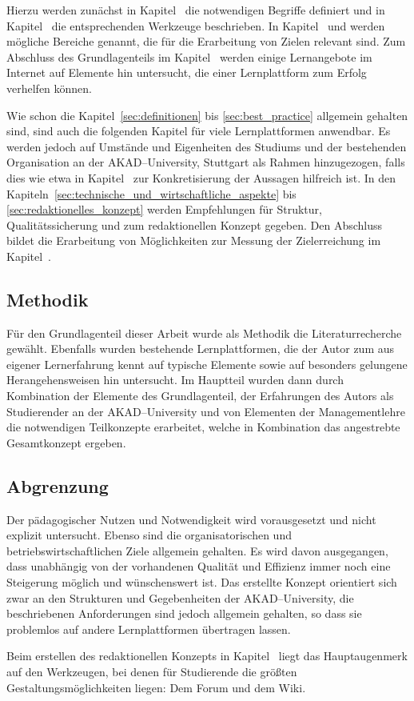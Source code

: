 Hierzu werden zunächst in Kapitel~ die notwendigen Begriffe definiert und in Kapitel~ die entsprechenden Werkzeuge beschrieben. In Kapitel~ und  werden mögliche Bereiche genannt, die für die Erarbeitung von Zielen relevant sind. Zum Abschluss des Grundlagenteils im Kapitel~ werden einige Lernangebote im Internet auf Elemente hin untersucht, die einer Lernplattform zum Erfolg verhelfen können.

Wie schon die Kapitel~\ref{sec:definitionen} bis \ref{sec:best_practice} allgemein gehalten sind, sind auch die folgenden Kapitel für viele Lernplattformen anwendbar. Es werden jedoch auf Umstände und Eigenheiten des Studiums und der bestehenden Organisation an der AKAD–University, Stuttgart als Rahmen hinzugezogen, falls dies wie etwa in Kapitel~ zur Konkretisierung der Aussagen hilfreich ist. In den Kapiteln~\ref{sec:technische_und_wirtschaftliche_aspekte} bis \ref{sec:redaktionelles_konzept} werden Empfehlungen für Struktur, Qualitätssicherung und zum redaktionellen Konzept gegeben. Den Abschluss bildet die Erarbeitung von Möglichkeiten zur Messung der Zielerreichung im Kapitel~.

\subsection{Methodik} %
\label{sub:methodik}
Für den Grundlagenteil dieser Arbeit wurde als Methodik die Literaturrecherche gewählt. Ebenfalls wurden bestehende Lernplattformen, die der Autor zum aus eigener Lernerfahrung kennt auf typische Elemente sowie auf besonders gelungene Herangehensweisen hin untersucht. Im Hauptteil wurden dann durch Kombination der Elemente des Grundlagenteil, der Erfahrungen des Autors als Studierender an der AKAD–University und von Elementen der Managementlehre die notwendigen Teilkonzepte erarbeitet, welche in Kombination das angestrebte Gesamtkonzept ergeben.

\subsection{Abgrenzung} %
\label{sub:abgrenzung}
Der pädagogischer Nutzen und Notwendigkeit wird vorausgesetzt und nicht explizit untersucht. Ebenso sind die organisatorischen und betriebswirtschaftlichen Ziele allgemein gehalten. Es wird davon ausgegangen, dass unabhängig von der vorhandenen Qualität und Effizienz immer noch eine Steigerung möglich und wünschenswert ist. Das erstellte Konzept orientiert sich zwar an den Strukturen und Gegebenheiten der AKAD–University, die beschriebenen Anforderungen sind jedoch allgemein gehalten, so dass sie problemlos auf andere Lernplattformen übertragen lassen. 

Beim erstellen des redaktionellen Konzepts in Kapitel~ liegt das Hauptaugenmerk auf den Werkzeugen, bei denen für Studierende die größten Gestaltungsmöglichkeiten liegen: Dem Forum und dem Wiki. 

